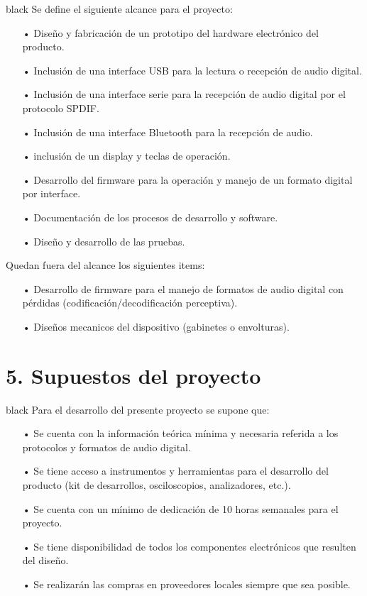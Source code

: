 \documentclass[
11pt, %
codirector, %
]{charter}
\begin{document}
\begin{consigna}{black}
Se define el siguiente alcance para el proyecto:
\begin{itemize}
	\item[•]Diseño y fabricación de un prototipo del hardware electrónico del producto.  
	\item[•]Inclusión de una interface USB para la lectura o recepción de audio digital. 
	\item[•]Inclusión de una interface serie para la recepción de audio digital por el protocolo SPDIF.
	\item[•]Inclusión de una interface Bluetooth para la recepción de audio.
	\item[•]inclusión de un display y teclas de operación.
	\item[•]Desarrollo del firmware para la operación y manejo de un formato digital por interface.
	\item[•]Documentación de los procesos de desarrollo y software.
	\item[•]Diseño y desarrollo de las pruebas.  
\end{itemize}	
Quedan fuera del alcance los siguientes items:
\begin{itemize}
	\item[•]Desarrollo de firmware para el manejo de formatos de audio digital con pérdidas (codificación/decodificación perceptiva).  
	\item[•]Diseños mecanicos del dispositivo (gabinetes o envolturas). 	
\end{itemize}
\end{consigna}


\section{5. Supuestos del proyecto}
\label{sec:supuestos}

\begin{consigna}{black}
Para el desarrollo del presente proyecto se supone que:

\begin{itemize}
	\item[•]Se cuenta con la información teórica mínima y necesaria referida a los protocolos y formatos de audio digital. 
	\item[•]Se tiene acceso a instrumentos y herramientas para el desarrollo del producto (kit de desarrollos, osciloscopios, analizadores, etc.).
	\item[•]Se cuenta con un mínimo de dedicación de 10 horas semanales para el proyecto.
	\item[•]Se tiene disponibilidad de todos los componentes electrónicos que resulten del diseño.
	\item[•]Se realizarán las compras en proveedores locales siempre que sea posible.  
\end{itemize}

\end{consigna}
\end{document}
